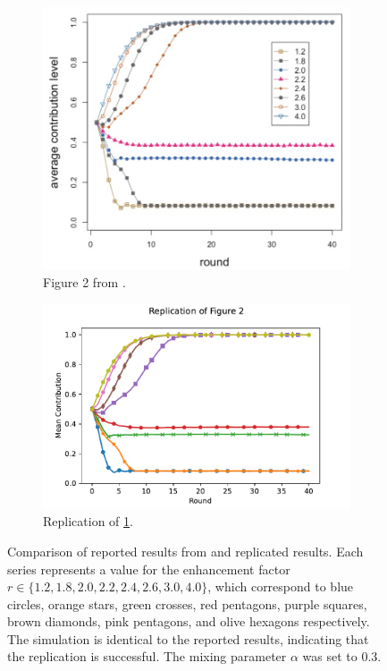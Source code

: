 \FloatBarrier 
\begin{figure}[!h]
  \begin{subfigure}[b]{0.45\textwidth}
    \includegraphics[width=\textwidth]{images/TAfig2_real.png}
    \caption{Figure 2 from \cite{RN49}. }
    \label{TAfig2_real}
  \end{subfigure}
  \hfill
  \begin{subfigure}[b]{0.45\textwidth}
    \includegraphics[width=1.25\textwidth]{images/final_TA_fig2.pdf}
    \caption{Replication of \ref{TAfig2_real}. }
    \label{TAfig2}
  \end{subfigure}
  \caption{Comparison of reported results from \cite{RN49} and replicated results. Each series represents a value for the enhancement factor $r \in \{1.2, 1.8, 2.0, 2.2, 2.4, 2.6, 3.0, 4.0\}$, which correspond to blue circles, orange stars, green crosses, red pentagons, purple squares, brown diamonds, pink pentagons, and olive hexagons respectively. The simulation is identical to the reported results, indicating that the replication is successful. The mixing parameter $\alpha$ was set to 0.3.} \label{comp0}
\end{figure} 
\FloatBarrier

